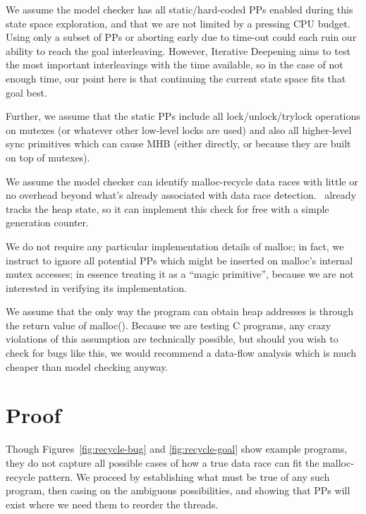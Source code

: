 \documentclass[pldi]{sigplanconf-pldi15}
\begin{document}
We assume the model checker has all static/hard-coded PPs enabled during this state space exploration, and that we are not limited by a pressing CPU budget.
Using only a subset of PPs or aborting early due to time-out could each ruin our ability to reach the goal interleaving.
However, Iterative Deepening aims to test the most important interleavings with the time available,
so in the case of not enough time, our point here is that continuing the current state space fits that goal best.

Further, we assume that the static PPs include all lock/unlock/trylock operations on mutexes (or whatever other low-level locks are used) and also all higher-level sync primitives which can cause MHB (either directly, or because they are built on top of mutexes).

We assume the model checker can identify malloc-recycle data races with little or no overhead beyond what's already associated with data race detection. \landslide~already tracks the heap state, so it can implement this check for free with a simple generation counter.

We do not require any particular implementation details of malloc; in fact, we instruct \landslide to
ignore all potential PPs which might be inserted on malloc's internal mutex accesses;
in essence treating it as a ``magic primitive'', because we are not interested in verifying its implementation.

We assume that the only way the program can obtain heap addresses is through the return value of malloc().
Because we are testing C programs, any crazy violations of this assumption are technically possible,
but should you wish to check for bugs like this,
we would recommend a data-flow analysis which is much cheaper than model checking anyway.


\section{Proof}

Though Figures~\ref{fig:recycle-bug} and \ref{fig:recycle-goal} show example programs, they do not capture all possible cases of how a true data race can fit the malloc-recycle pattern.
We proceed by establishing what must be true of any such program, then casing on the ambiguous possibilities, and showing that PPs will exist where we need them to reorder the threads.
\end{document}
